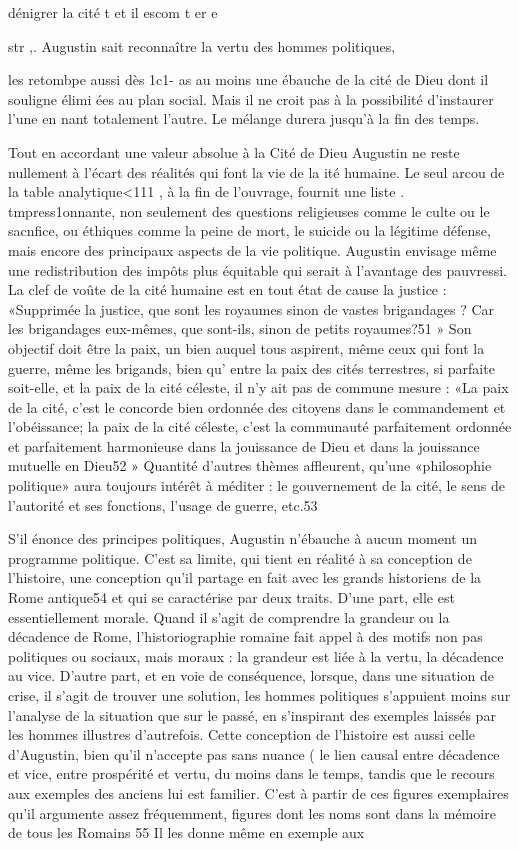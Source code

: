 dénigrer la cité t
et il escom t	er e
 

str ,. Augustin sait reconnaître la vertu des hommes politiques,
 
les retombpe aussi dès 1c1- as au moins une ébauche de la cité de Dieu dont il souligne élimi	ées au plan social. Mais il ne croit pas à la possibilité d'instaurer l'une en
nant totalement l'autre. Le mélange durera jusqu'à la fin des temps.

Tout en accordant une valeur absolue à la Cité de Dieu Augustin ne reste nullement à l'écart des réalités qui font la vie de la ité humaine. Le seul arcou de la table analytique<111 , à la fin de l'ouvrage,  fournit une liste
. tmpress1onnante, non seulement des questions religieuses comme le culte ou le sacnfice, ou éthiques comme la peine de mort, le suicide ou la légitime défense, mais encore des principaux aspects de la vie politique. Augustin envisage même une redistribution des impôts plus équitable qui serait à l'avantage des pauvressi. La clef de voûte de la cité humaine est en tout état de cause la justice : «Supprimée la justice, que sont les royaumes sinon de vastes brigandages ? Car les brigandages eux-mêmes, que sont-ils, sinon de petits royaumes?51 » Son objectif doit être la paix, un bien auquel tous aspirent, même ceux qui font la guerre, même les brigands, bien qu' entre la paix des cités terrestres, si parfaite soit-elle, et la paix de la cité céleste, il n'y ait pas de commune mesure : «La paix de la cité, c'est le concorde bien ordonnée des citoyens dans le commandement et l'obéissance; la paix de la cité céleste, c'est la communauté parfaitement ordonnée et parfaitement harmonieuse dans la jouissance de Dieu et dans la jouissance mutuelle en Dieu52    » Quantité d'autres thèmes affleurent, qu'une «philosophie politique» aura toujours intérêt à méditer : le gouvernement de la cité, le sens de l'autorité et ses fonctions, l'usage de guerre, etc.53

S'il énonce des principes politiques,  Augustin n'ébauche à aucun moment un programme politique. C'est sa limite, qui tient en réalité à sa conception de l'histoire, une conception qu'il partage en fait avec les grands historiens de la Rome antique54 et qui se caractérise par deux traits. D'une part, elle est essentiellement morale. Quand il s'agit de comprendre la grandeur ou la décadence de Rome, l'historiographie romaine fait appel à des motifs non pas politiques ou sociaux, mais moraux : la grandeur est liée à la vertu, la décadence au vice. D'autre part, et en voie de conséquence, lorsque, dans une situation de crise, il s'agit de trouver une solution, les hommes politiques s'appuient moins sur l'analyse de la situation que sur le passé,
en s'inspirant des exemples laissés par les hommes illustres d'autrefois. Cette
conception de l'histoire est aussi celle d'Augustin, bien qu'il n'accepte pas sans nuance	(
le lien causal entre décadence et vice, entre prospérité et vertu, du moins dans le temps, tandis que le recours aux exemples des anciens lui est familier. C'est à partir de ces figures exemplaires qu'il argumente assez fréquemment, figures dont les noms sont dans la mémoire de tous les Romains 55   Il les donne même en exemple aux


